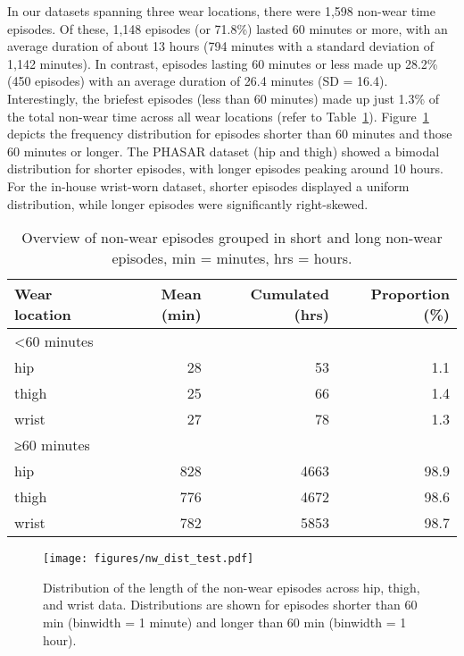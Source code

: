 \documentclass[
  10pt,
]{scrbook}
\begin{document}
In our datasets spanning three wear locations, there were 1,598 non-wear
time episodes. Of these, 1,148 episodes (or 71.8\%) lasted 60 minutes or
more, with an average duration of about 13 hours (794 minutes with a
standard deviation of 1,142 minutes). In contrast, episodes lasting 60
minutes or less made up 28.2\% (450 episodes) with an average duration
of 26.4 minutes (SD = 16.4). Interestingly, the briefest episodes (less
than 60 minutes) made up just 1.3\% of the total non-wear time across
all wear locations (refer to Table~\ref{tbl-9}).
Figure~\ref{fig-paper2_nw_dists} depicts the frequency distribution for
episodes shorter than 60 minutes and those 60 minutes or longer. The
PHASAR dataset (hip and thigh) showed a bimodal distribution for shorter
episodes, with longer episodes peaking around 10 hours. For the in-house
wrist-worn dataset, shorter episodes displayed a uniform distribution,
while longer episodes were significantly right-skewed.

\begingroup

\footnotesize

\hypertarget{tbl-9}{}
\begin{longtable}{lrrr}
\caption{\label{tbl-9}Overview of non-wear episodes grouped in short and long non-wear
episodes, min = minutes, hrs = hours. }\tabularnewline

\toprule
Wear location & Mean (min) & Cumulated (hrs) & Proportion (\%) \\ 
\midrule
\multicolumn{4}{l}{<60 minutes} \\ 
\midrule
hip & 28 & 53 & 1.1 \\ 
thigh & 25 & 66 & 1.4 \\ 
wrist & 27 & 78 & 1.3 \\ 
\midrule
\multicolumn{4}{l}{≥60 minutes} \\ 
\midrule
hip & 828 & 4663 & 98.9 \\ 
thigh & 776 & 4672 & 98.6 \\ 
wrist & 782 & 5853 & 98.7 \\ 
\bottomrule
\end{longtable}

\endgroup

\begin{figure}

{\centering \texttt{[image: figures/nw\_dist\_test.pdf]}

}

\caption{\label{fig-paper2_nw_dists}Distribution of the length of the
non-wear episodes across hip, thigh, and wrist data. Distributions are
shown for episodes shorter than 60 min (binwidth = 1 minute) and longer
than 60 min (binwidth = 1 hour).}

\end{figure}
\end{document}
